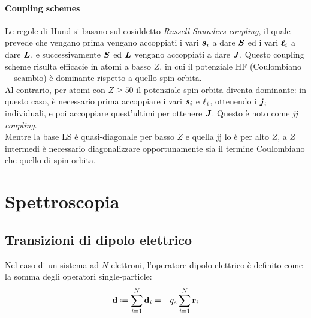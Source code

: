 
\paragraph{Coupling schemes}

Le regole di Hund si basano sul cosiddetto \textit{Russell-Saunders coupling}, il quale prevede che vengano prima vengano accoppiati i vari $ \boldsymbol{s}_i $ a dare $ \boldsymbol{S} $ ed i vari $ \boldsymbol{\ell}_i $ a dare $ \boldsymbol{L} $, e successivamente $ \boldsymbol{S} $ ed $ \boldsymbol{L} $ vengano accoppiati a dare $ \boldsymbol{J} $. Questo coupling scheme risulta efficacie in atomi a basso $ Z $, in cui il potenziale HF (Coulombiano + scambio) è dominante rispetto a quello spin-orbita. \\
Al contrario, per atomi con $ Z \ge 50 $ il potenziale spin-orbita diventa dominante\footnotemark: in questo caso, è necessario prima accoppiare i vari $ \boldsymbol{s}_i $ e $ \boldsymbol{\ell}_i $, ottenendo i $ \boldsymbol{j}_i $ individuali, e poi accoppiare quest'ultimi per ottenere $ \boldsymbol{J} $. Questo è noto come \textit{jj coupling}. \\
Mentre la base LS è quasi-diagonale per basso $ Z $ e quella jj lo è per alto $ Z $, a $ Z $ intermedi è necessario diagonalizzare opportunamente sia il termine Coulombiano che quello di spin-orbita.


\section{Spettroscopia}

\subsection{Transizioni di dipolo elettrico}

Nel caso di un sistema ad $ N $ elettroni, l'operatore dipolo elettrico è definito come la somma degli operatori single-particle:
\begin{equation}
	\ve{d} \defeq \sum_{i = 1}^{N} \ve{d}_i = - q_e \sum_{i = 1}^{N} \ve{r}_i
\end{equation}

